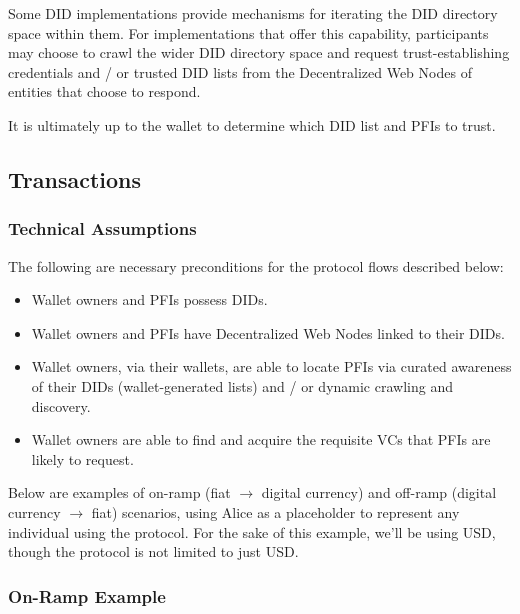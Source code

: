 \documentclass[11pt]{article}
\begin{document}
Some DID implementations provide mechanisms for iterating the DID directory space within them. For implementations that offer this capability, participants may choose to crawl the wider DID directory space and request trust-establishing credentials and / or trusted DID lists from the Decentralized Web Nodes of entities that choose to respond.

\vspace{1\baselineskip}
It is ultimately up to the wallet to determine which DID list and PFIs to trust.

\vspace{1\baselineskip}
\subsection{Transactions}

\subsubsection{Technical Assumptions}

The following are necessary preconditions for the protocol flows described below:

\begin{itemize}
	\item Wallet owners and PFIs possess DIDs. 

	\item Wallet owners and PFIs have Decentralized Web Nodes linked to their DIDs.

	\item Wallet owners, via their wallets, are able to locate PFIs via curated awareness of their DIDs (wallet-generated lists) and / or dynamic crawling and discovery.

	\item Wallet owners are able to find and acquire the requisite VCs that PFIs are likely to request.

\vspace{1\baselineskip}
\end{itemize}
Below are examples of on-ramp (fiat $\rightarrow$ digital currency) and off-ramp (digital currency $\rightarrow$ fiat) scenarios, using Alice as a placeholder to represent any individual using the protocol. For the sake of this example, we’ll be using USD, though the protocol is not limited to just USD.

\subsubsection{On-Ramp Example}
\end{document}
